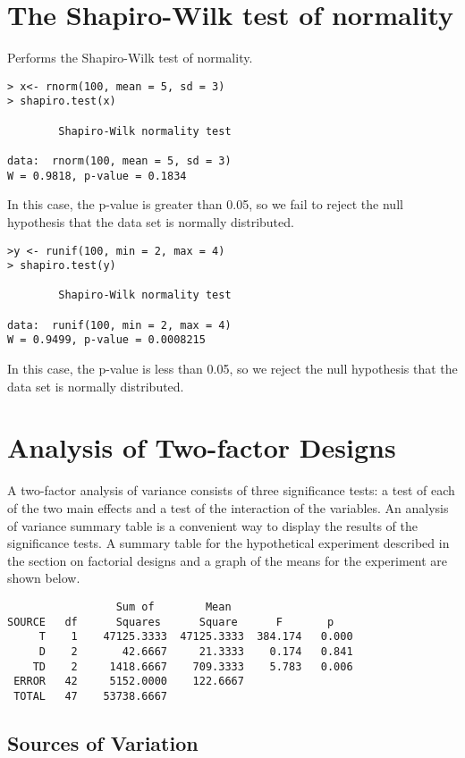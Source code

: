 \documentclass[12pt, a4paper]{report}
\theoremstyle{plain}
\theoremstyle{definition}
\theoremstyle{remark}
\begin{document}
\section{The Shapiro-Wilk test of normality}
Performs the Shapiro-Wilk test of normality.
\begin{verbatim}
> x<- rnorm(100, mean = 5, sd = 3)
> shapiro.test(x)

        Shapiro-Wilk normality test

data:  rnorm(100, mean = 5, sd = 3)
W = 0.9818, p-value = 0.1834
\end{verbatim}
In this case, the p-value is greater than 0.05, so we fail to reject the null hypothesis that the
data set is normally distributed.
\begin{verbatim}
>y <- runif(100, min = 2, max = 4)
> shapiro.test(y)

        Shapiro-Wilk normality test

data:  runif(100, min = 2, max = 4)
W = 0.9499, p-value = 0.0008215
\end{verbatim}
In this case, the p-value is less than 0.05, so we reject the null hypothesis that the
data set is normally distributed.

\section{Analysis of Two-factor Designs}

A two-factor analysis of variance consists of three significance tests: a test of each of the two main effects and a test of the interaction of the variables. An analysis of variance summary table is a convenient way to display the results of the significance tests. A summary table for the hypothetical experiment described in the section on factorial designs and a graph of the means for the experiment are shown below.

\begin{verbatim}
                 Sum of        Mean
SOURCE   df      Squares      Square      F       p
     T    1    47125.3333  47125.3333  384.174   0.000
     D    2       42.6667     21.3333    0.174   0.841
    TD    2     1418.6667    709.3333    5.783   0.006
 ERROR   42     5152.0000    122.6667
 TOTAL   47    53738.6667
\end{verbatim}

\subsection{Sources of Variation}
\end{document}
